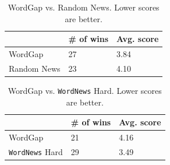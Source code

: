 

\begin{table}[th]
    \caption{WordGap vs. Random News.  Lower scores are better.}
    \label{table:distractor_1}
    \begin{center}
    \begin{tabular}{| p{2.5cm} | p{1.5cm} | p{1.8cm} |}
        \hline
         & {\bf \# of wins} & {\bf Avg. score}\\
        \hline
        WordGap & 27 & 3.84\\
        \hline
        Random News & 23 & 4.10\\
        \hline
    \end{tabular}
    \end{center}
\end{table}

\begin{table}[th]
    \caption{WordGap vs. {\tt WordNews} Hard.  Lower scores are better.}
    \label{table:distractor_2}
    \begin{center}
    \begin{tabular}{| p{2.5cm} | p{1.5cm} | p{1.8cm} |}
        \hline
         & {\bf \# of wins} & {\bf Avg. score}\\
        \hline
        WordGap & 21 & 4.16\\
        \hline
        {\tt WordNews} Hard & 29 & 3.49\\
        \hline
    \end{tabular}
    \end{center}
\end{table}


